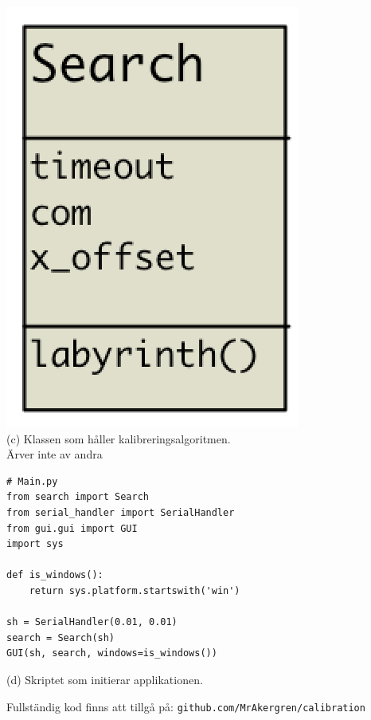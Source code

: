\begin{minipage}[l]{0.49\textwidth}
    \vspace*{2em}
    \centering
        \includegraphics[scale=0.25]{res/img/search_uml} \\
        \vspace*{3.7em}
        (c) Klassen som håller kalibreringsalgoritmen. \\ Ärver inte av andra
\end{minipage}
\begin{minipage}[l]{0.49\textwidth}
    \vspace{-3.5em}
        \begin{verbatim}
# Main.py
from search import Search
from serial_handler import SerialHandler
from gui.gui import GUI
import sys

def is_windows():
    return sys.platform.startswith('win')

sh = SerialHandler(0.01, 0.01)
search = Search(sh)
GUI(sh, search, windows=is_windows())
\end{verbatim}
        \centering
        (d) Skriptet som initierar applikationen.
\end{minipage}

\vfill
\begin{center}
Fullständig kod finns att tillgå på: \texttt{github.com/MrAkergren/calibration}
\end{center}

